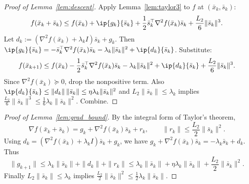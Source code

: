 \documentclass[review,onefignum,onetabnum]{siamart171218}
\begin{document}
\begin{proof}[Proof of Lemma~\ref{lem:descent}]
Apply Lemma~\ref{lem:taylor3} to $f$ at $(\bar x_k,\bar s_k)$:
\[
f(\bar x_k+\bar s_k)\le f(\bar x_k)+\ip{g_k}{\bar s_k}+\frac12\bar s_k^\top\nabla^2 f(\bar x_k)\bar s_k+\frac{L_2}{6}\|\bar s_k\|^3.
\]
Let $d_k:=(\nabla^2 f(\bar x_k)+\lambda_k I)\bar s_k+g_k$.
Then $\ip{g_k}{\bar s_k}=-\bar s_k^\top\nabla^2 f(\bar x_k)\bar s_k-\lambda_k\|\bar s_k\|^2+\ip{d_k}{\bar s_k}$.
Substitute:
\[
f(\bar x_{k+1})\le f(\bar x_k)-\frac12\bar s_k^\top\nabla^2 f(\bar x_k)\bar s_k-\lambda_k\|\bar s_k\|^2+\ip{d_k}{\bar s_k}+\frac{L_2}{6}\|\bar s_k\|^3.
\]
Since $\nabla^2 f(\bar x_k)\succeq 0$, drop the nonpositive term. Also
$\ip{d_k}{\bar s_k}\le \|d_k\|\,\|\bar s_k\|\le \eta\lambda_k\|\bar s_k\|^2$
and $L_2\|\bar s_k\|\le \lambda_k$ implies $\frac{L_2}{6}\|\bar s_k\|^3\le \frac16\lambda_k\|\bar s_k\|^2$.
Combine.
\end{proof}

\begin{proof}[Proof of Lemma~\ref{lem:grad_bound}]
By the integral form of Taylor's theorem,
\[
\nabla f(\bar x_k+\bar s_k)=g_k+\nabla^2 f(\bar x_k)\bar s_k+r_k,
\qquad \|r_k\|\le \frac{L_2}{2}\|\bar s_k\|^2.
\]
Using $d_k=(\nabla^2 f(\bar x_k)+\lambda_k I)\bar s_k+g_k$, we have
$g_k+\nabla^2 f(\bar x_k)\bar s_k=-\lambda_k\bar s_k+d_k$.
Thus
\[
\|g_{k+1}\|\le \lambda_k\|\bar s_k\|+\|d_k\|+\|r_k\|
\le \lambda_k\|\bar s_k\|+\eta\lambda_k\|\bar s_k\|+\frac{L_2}{2}\|\bar s_k\|^2.
\]
Finally $L_2\|\bar s_k\|\le \lambda_k$ implies $\frac{L_2}{2}\|\bar s_k\|^2\le \frac12\lambda_k\|\bar s_k\|$.
\end{proof}
\end{document}
